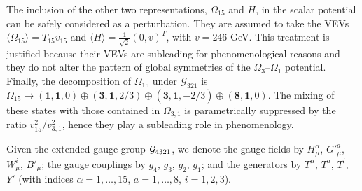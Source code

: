The inclusion of the other two representations, $\Omega_{15}$ and $H$, in the scalar potential can be safely considered as a perturbation. They are assumed to take the VEVs $\langle \Omega_{15} \rangle = T_{15} v_{15}$ and $\langle H \rangle = \tfrac{1}{\sqrt{2}} (0, v)^T$, with $v = 246$ GeV. This treatment is justified because their VEVs are subleading for phenomenological reasons and they do not alter the pattern of global symmetries of the $\Omega_3$--$\Omega_1$ potential.
Finally, the decomposition of $\Omega_{15}$ under $\mathcal{G}_{321}$ is $\Omega_{15} \to (\mathbf{1},\mathbf{1},0) \oplus (\mathbf{3},\mathbf{1},2/3) \oplus (\mathbf{\bar 3},\mathbf{1},-2/3) \oplus (\mathbf{8}, \mathbf{1}, 0)$. The mixing of these states with those contained in $\Omega_{3,1}$ is parametrically suppressed by the ratio $v^2_{15} / v^2_{3,1}$, hence they play a subleading role in phenomenology.


Given the extended gauge group $\mathcal{G}_{\rm 4321}$,
we denote the gauge fields by $H^\alpha_\mu$, $G'^a_\mu$, $W^i_\mu$, $B'_\mu$; the gauge couplings by $g_4$, $g_3$, $g_2$, $g_1$; and the generators by $T^\alpha$, $T^a$, $T^i$, $Y'$
(with indices $\alpha = 1, \dots, 15$, $a = 1, \dots, 8$, $i=1,2,3$). 

